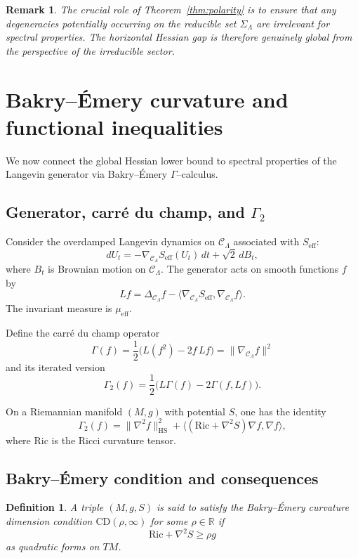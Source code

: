 \documentclass[11pt]{article}
\numberwithin{equation}{section}
\newtheorem{definition}[theorem]{Definition}
\newtheorem{remark}[theorem]{Remark}
\begin{document}
\begin{remark}
The crucial role of Theorem~\ref{thm:polarity} is to ensure that any
degeneracies potentially occurring on the reducible set
$\Sigma_\Lambda$ are irrelevant for spectral properties.  The horizontal
Hessian gap is therefore genuinely global from the perspective of the
irreducible sector.
\end{remark}

\section{Bakry--\'Emery curvature and functional inequalities}

We now connect the global Hessian lower bound to spectral properties of
the Langevin generator via Bakry--\'Emery $\Gamma$--calculus.

\subsection{Generator, carré du champ, and $\Gamma_2$}

Consider the overdamped Langevin dynamics on $\mathcal{C}_\Lambda$
associated with $S_{\mathrm{eff}}$:
\[
  dU_t = -\nabla_{\mathcal{C}_\Lambda} S_{\mathrm{eff}}(U_t)\,dt
         + \sqrt{2}\,dB_t,
\]
where $B_t$ is Brownian motion on $\mathcal{C}_\Lambda$.  The generator
acts on smooth functions $f$ by
\[
  L f = \Delta_{\mathcal{C}_\Lambda} f
        - \langle\nabla_{\mathcal{C}_\Lambda}S_{\mathrm{eff}},
                \nabla_{\mathcal{C}_\Lambda} f\rangle.
\]
The invariant measure is $\mu_{\mathrm{eff}}$.

Define the carré du champ operator
\[
  \Gamma(f) = \frac{1}{2}\big(L(f^2) - 2 f\,Lf\big)
            = \|\nabla_{\mathcal{C}_\Lambda} f\|^2
\]
and its iterated version
\[
  \Gamma_2(f)
  = \frac{1}{2}\big(L\Gamma(f) - 2\Gamma(f,Lf)\big).
\]

On a Riemannian manifold $(M,g)$ with potential $S$, one has the
identity
\[
  \Gamma_2(f)
  = \|\nabla^2 f\|_{\mathrm{HS}}^2
    + \langle(\mathrm{Ric} + \nabla^2 S)\nabla f,\nabla f\rangle,
\]
where $\mathrm{Ric}$ is the Ricci curvature tensor.

\subsection{Bakry--\'Emery condition and consequences}

\begin{definition}
A triple $(M,g,S)$ is said to satisfy the Bakry--\'Emery curvature
dimension condition $\mathrm{CD}(\rho,\infty)$ for some $\rho\in\mathbb{R}$
if
\[
  \mathrm{Ric} + \nabla^2 S \ge \rho g
\]
as quadratic forms on $TM$.
\end{definition}
\end{document}
